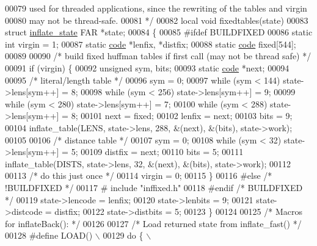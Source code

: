 \begin{DoxyCode}
00079 \textcolor{comment}{   used for threaded applications, since the rewriting of the tables and virgin}
00080 \textcolor{comment}{   may not be thread-safe.}
00081 \textcolor{comment}{ */}
00082 local \textcolor{keywordtype}{void} fixedtables(state)
00083 \textcolor{keyword}{struct }\hyperlink{structinflate__state}{inflate\_state} FAR *state;
00084 \{
00085 \textcolor{preprocessor}{#ifdef BUILDFIXED}
00086     \textcolor{keyword}{static} \textcolor{keywordtype}{int} virgin = 1;
00087     \textcolor{keyword}{static} \hyperlink{structcode}{code} *lenfix, *distfix;
00088     \textcolor{keyword}{static} \hyperlink{structcode}{code} fixed[544];
00089 
00090     \textcolor{comment}{/* build fixed huffman tables if first call (may not be thread safe) */}
00091     \textcolor{keywordflow}{if} (virgin) \{
00092         \textcolor{keywordtype}{unsigned} sym, bits;
00093         \textcolor{keyword}{static} \hyperlink{structcode}{code} *next;
00094 
00095         \textcolor{comment}{/* literal/length table */}
00096         sym = 0;
00097         \textcolor{keywordflow}{while} (sym < 144) state->lens[sym++] = 8;
00098         \textcolor{keywordflow}{while} (sym < 256) state->lens[sym++] = 9;
00099         \textcolor{keywordflow}{while} (sym < 280) state->lens[sym++] = 7;
00100         \textcolor{keywordflow}{while} (sym < 288) state->lens[sym++] = 8;
00101         next = fixed;
00102         lenfix = next;
00103         bits = 9;
00104         inflate\_table(LENS, state->lens, 288, &(next), &(bits), state->work);
00105 
00106         \textcolor{comment}{/* distance table */}
00107         sym = 0;
00108         \textcolor{keywordflow}{while} (sym < 32) state->lens[sym++] = 5;
00109         distfix = next;
00110         bits = 5;
00111         inflate\_table(DISTS, state->lens, 32, &(next), &(bits), state->work);
00112 
00113         \textcolor{comment}{/* do this just once */}
00114         virgin = 0;
00115     \}
00116 \textcolor{preprocessor}{#else }\textcolor{comment}{/* !BUILDFIXED */}\textcolor{preprocessor}{}
00117 \textcolor{preprocessor}{#   include "inffixed.h"}
00118 \textcolor{preprocessor}{#endif }\textcolor{comment}{/* BUILDFIXED */}\textcolor{preprocessor}{}
00119     state->lencode = lenfix;
00120     state->lenbits = 9;
00121     state->distcode = distfix;
00122     state->distbits = 5;
00123 \}
00124 
00125 \textcolor{comment}{/* Macros for inflateBack(): */}
00126 
00127 \textcolor{comment}{/* Load returned state from inflate\_fast() */}
00128 \textcolor{preprocessor}{#define LOAD() \(\backslash\)}
00129 \textcolor{preprocessor}{    do \{ \(\backslash\)}

\end{DoxyCode}
